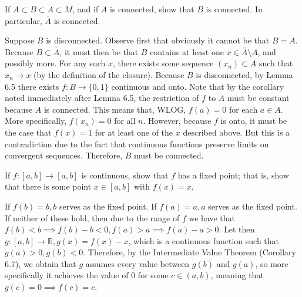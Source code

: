 \begin{exercise}{9}
    If $A \subset B \subset \overline{A} \subset M$, and if $A$ is connected, show that $B$ is connected.
    In particular, $\overline{A}$ is connected.
\end{exercise}

\begin{solution}
    
    Suppose $B$ is disconnected.
    Observe first that obviously it cannot be that $B = A$.
    Because $B \subset \overline{A}$, it must then be that $B$ contains at least one $x \in \overline{A} \setminus A$, and possibly more.
    For any such $x$, there exists some sequence $(x_n) \subset A$ such that $x_n \rightarrow x$ (by the definition of the closure).
    Because $B$ is disconnected, by Lemma 6.5 there exists $f: B \rightarrow \{0, 1\}$ continuous and onto.
    Note that by the corollary noted immediately after Lemma 6.5, the restriction of $f$ to $A$ must be constant because $A$ is connected.
    This means that, WLOG, $f(a) = 0$ for each $a \in A$.
    More specifically, $f(x_n) = 0$ for all $n$.
    However, because $f$ is onto, it must be the case that $f(x) = 1$ for at least one of the $x$ described above.
    But this is a contradiction due to the fact that continuous functions preserve limits on convergent sequences.
    Therefore, $B$ must be connected.
\end{solution}

\begin{exercise}{13}
    If $f: [a, b] \rightarrow [a, b]$ is continuous, show that $f$ has a fixed point; that is, show that there is some point $x \in [a, b]$ with $f(x) = x$.
\end{exercise}

\begin{solution}

    If $f(b) = b, b$ serves as the fixed point.
    If $f(a) = a, a$ serves as the fixed point.
    If neither of these hold, then due to the range of $f$ we have that $f(b) < b \implies f(b) - b < 0, f(a) > a \implies f(a) - a > 0$.
    Let then $g: [a, b] \rightarrow \mathbb{R}, g(x) = f(x) - x$, which is a continuous function such that $g(a) > 0, g(b) < 0$.
    Therefore, by the Intermediate Value Theorem (Corollary 6.7), we obtain that $g$ assumes every value between $g(b)$ and $g(a)$, so more specifically it achieves the value of 0 for some $c \in (a, b)$, meaning that $g(c) = 0 \implies f(c) = c$.
\end{solution}

